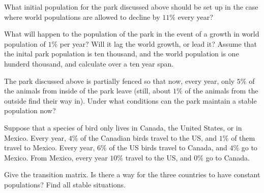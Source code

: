 \begin{exercises}
  \item 
    What initial population for the park discussed above
    should be set up in the
    case where world populations are allowed to decline by $11\%$ every year?
  \item 
    What will happen to the population of the park in the event of
    a growth in world population of $1\%$ per year?
    Will it lag the world growth, or lead it?
    Assume that the inital park population is ten thousand, and the
    world population is one hunderd thousand, 
    and calculate over a ten year span.
  \item 
    The park discussed above is partially fenced so that now,
    every year, only $5\%$ of the animals from inside of the park leave (still,
    about $1\%$ of the animals from the outside 
    find their way in).
    Under what conditions can the park maintain a stable population now?
  \item 
    Suppose that a species of bird only lives in Canada, the United States,
    or in Mexico.
    Every year, $4\%$ of the Canadian birds travel to the US, and $1\%$ of them
    travel to Mexico.
    Every year, $6\%$ of the US birds travel to Canada, and $4\%$ go to Mexico.
    From Mexico, every year $10\%$ travel to the US, and $0\%$ go to Canada.
    \begin{exparts}
      \partsitem Give the transition matrix.
      \partsitem Is there a way for the three countries to have constant
         populations?
      \partsitem Find all stable situations.   
    \end{exparts}
\end{exercises}
\endinput






